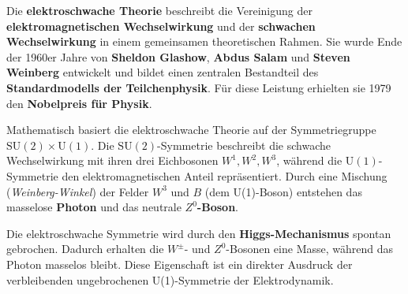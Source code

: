 Die \textbf{elektroschwache Theorie} beschreibt die Vereinigung der \textbf{elektromagnetischen Wechselwirkung} und der \textbf{schwachen Wechselwirkung} in einem gemeinsamen theoretischen Rahmen.  
Sie wurde Ende der 1960er Jahre von \textbf{Sheldon Glashow}, \textbf{Abdus Salam} und \textbf{Steven Weinberg} entwickelt und bildet einen zentralen Bestandteil des \textbf{Standardmodells der Teilchenphysik}.  
Für diese Leistung erhielten sie 1979 den \textbf{Nobelpreis für Physik}.

Mathematisch basiert die elektroschwache Theorie auf der Symmetriegruppe \(\mathrm{SU(2)} \times \mathrm{U(1)}\).  
Die \(\mathrm{SU(2)}\)-Symmetrie beschreibt die schwache Wechselwirkung mit ihren drei Eichbosonen \(W^1, W^2, W^3\), während die \(\mathrm{U(1)}\)-Symmetrie den elektromagnetischen Anteil repräsentiert.  
Durch eine Mischung (\emph{Weinberg-Winkel}) der Felder \(W^3\) und \(B\) (dem U(1)-Boson) entstehen das masselose \textbf{Photon} und das neutrale \textbf{\(Z^0\)-Boson}.

Die elektroschwache Symmetrie wird durch den \textbf{Higgs-Mechanismus} spontan gebrochen.  
Dadurch erhalten die \(W^\pm\)- und \(Z^0\)-Bosonen eine Masse, während das Photon masselos bleibt.  
Diese Eigenschaft ist ein direkter Ausdruck der verbleibenden ungebrochenen U(1)-Symmetrie der Elektrodynamik.

